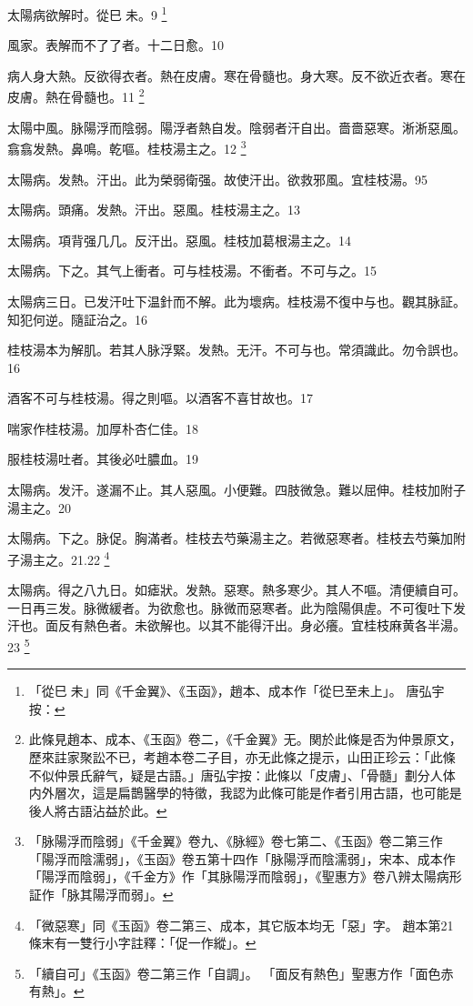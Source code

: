 太陽病欲解时。從巳{\sungtpii 𥁞}未。9
	\footnote{
		「從巳{\sungtpii 𥁞}未」同《千金翼》、《玉函》，趙本、成本作「從巳至未上」。
		唐弘宇按：
	}

風家。表解而不了了者。十二日愈。10

病人身大熱。反欲得衣者。熱在皮膚。寒在骨髓也。身大寒。反不欲近衣者。寒在皮膚。熱在骨髓也。11
	\footnote{
		此條見趙本、成本、《玉函》卷二，《千金翼》无。関於此條是否为仲景原文，歷來註家聚訟不已，考趙本卷二子目，亦无此條之提示，山田正珍云：「此條不似仲景氏辭气，疑是古語。」唐弘宇按：此條以「皮膚」、「骨髓」劃分人体内外層次，這是扁鵲醫學的特徵，我認为此條可能是作者引用古語，也可能是後人將古語沾益於此。
	}

太陽中風。{\khaaitp 脉}陽浮而陰弱。陽浮者熱自发。陰弱者汗自出。嗇嗇惡寒。淅淅惡風。翕翕发熱。鼻鳴。乾嘔。桂枝湯主之。12
	\footnote{
		「脉陽浮而陰弱」《千金翼》卷九、《脉經》卷七第二、《玉函》卷二第三作「陽浮而陰濡弱」，《玉函》卷五第十四作「脉陽浮而陰濡弱」，宋本、成本作「陽浮而陰弱」，《千金方》作「其脉陽浮而陰弱」，《聖惠方》卷八辨太陽病形証作「脉其陽浮而弱」。
	}

太陽病。发熱。汗出。此为榮弱衛强。故使汗出。欲救邪風。宜桂枝湯。95

太陽病。頭痛。发熱。汗出。惡風。桂枝湯主之。13

太陽病。項背强几几。反汗出。惡風。桂枝{\khaaitp 加葛根}湯主之。14

太陽病。下之。其气上衝者。可与桂枝湯。不衝者。不可与之。15

太陽病三日。已发汗吐下温針而不解。此为壞病。桂枝湯不復中与也。觀其脉証。知犯何逆。隨証治之。16

桂枝湯本为解肌。若其人脉浮緊。发熱。无汗。不可与也。常須識此。勿令誤也。16

酒客不可与桂枝湯。得之則嘔。以酒客不喜甘故也。17

喘家作桂枝湯。加厚朴杏仁佳。18

服桂枝湯吐者。其後必吐膿血。19

太陽病。发汗。遂漏不止。其人惡風。小便難。四肢微急。難以屈伸。桂枝加附子湯主之。20

太陽病。下之。脉促。胸滿者。桂枝去芍藥湯主之。若微{\khaaitp 惡}寒者。桂枝去芍藥加附子湯主之。21.22
	\footnote{
		「微惡寒」同《玉函》卷二第三、成本，其它版本均无「惡」字。
		趙本第21條末有一雙行小字註釋：「促一作縱」。
	}

太陽病。得之八九日。如瘧狀。发熱。惡寒。熱多寒少。其人不嘔。清便續自可。一日再三发。脉微緩者。为欲愈也。脉微而惡寒者。此为陰陽俱虗。不可復{\khaaitp 吐下}发汗也。面反有熱色者。未欲解也。以其不能得汗出。身必癢。宜桂枝麻黄各半湯。23
	\footnote{
		「續自可」《玉函》卷二第三作「自調」。
		「面反有熱色」聖惠方作「面色赤有熱」。
	}

